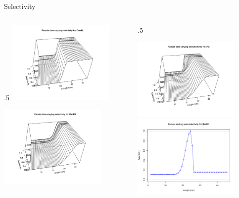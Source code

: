 \documentclass[ignorenonframetext,]{beamer}
\def\begincols{\begin{columns}}
\def\begincol{\begin{column}}
\def\endcol{\end{column}}
\def\endcols{\end{columns}}
\begin{document}
\begin{frame}{Selectivity}

\begincols
 \begincol{.5\textwidth}
\includegraphics[height=4cm]{r4ss/plots_mod1/sel03_len_timevary_surf_flt1sex1.png}

\includegraphics[height=4cm]{r4ss/plots_mod1/sel03_len_timevary_surf_flt4sex1.png}
\endcol
 \begincol{.5\textwidth}

\includegraphics[height=4cm]{r4ss/plots_mod1/sel03_len_timevary_surf_flt5sex1.png}\\
\includegraphics[height=4cm]{r4ss/plots_mod1/sel09_len_flt6sex1.png}\\
\endcol
\endcols

\end{frame}
\end{document}

